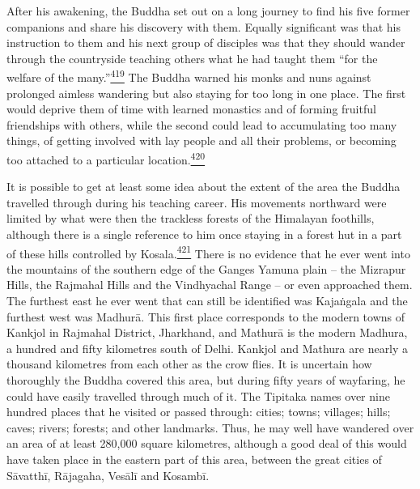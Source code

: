 After his awakening, the Buddha set out on a long journey to find his
five former companions and share his discovery with them. Equally
significant was that his instruction to them and his next group of
disciples was that they should wander through the countryside teaching
others what he had taught them ``for the welfare of the
many.''\label{footprints_split_012.html_fnref419}\hyperref[footprints_split_025.htmlux5cux23fn419]{\textsuperscript{419}}
The Buddha warned his monks and nuns against prolonged aimless wandering
but also staying for too long in one place. The first would deprive them
of time with learned monastics and of forming fruitful friendships with
others, while the second could lead to accumulating too many things, of
getting involved with lay people and all their problems, or becoming too
attached to a particular
location.\label{footprints_split_012.html_fnref420}\hyperref[footprints_split_025.htmlux5cux23fn420]{\textsuperscript{420}}

It is possible to get at least some idea about the extent of the area
the Buddha travelled through during his teaching career. His movements
northward were limited by what were then the trackless forests of the
Himalayan foothills, although there is a single reference to him once
staying in a forest hut in a part of these hills controlled by
Kosala.\label{footprints_split_012.html_fnref421}\hyperref[footprints_split_025.htmlux5cux23fn421]{\textsuperscript{421}}
There is no evidence that he ever went into the mountains of the
southern edge of the Ganges Yamuna plain -- the Mizrapur Hills, the
Rajmahal Hills and the Vindhyachal Range -- or even approached them. The
furthest east he ever went that can still be identified was Kajaṅgala
and the furthest west was Madhurā. This first place corresponds to the
modern towns of Kankjol in Rajmahal District, Jharkhand, and Mathurā is
the modern Madhura, a hundred and fifty kilometres south of Delhi.
Kankjol and Mathura are nearly a thousand kilometres from each other as
the crow flies. It is uncertain how thoroughly the Buddha covered this
area, but during fifty years of wayfaring, he could have easily
travelled through much of it. The Tipitaka names over nine hundred
places that he visited or passed through: cities; towns; villages;
hills; caves; rivers; forests; and other landmarks. Thus, he may well
have wandered over an area of at least 280,000 square kilometres,
although a good deal of this would have taken place in the eastern part
of this area, between the great cities of Sāvatthī, Rājagaha, Vesālī and
Kosambī.

